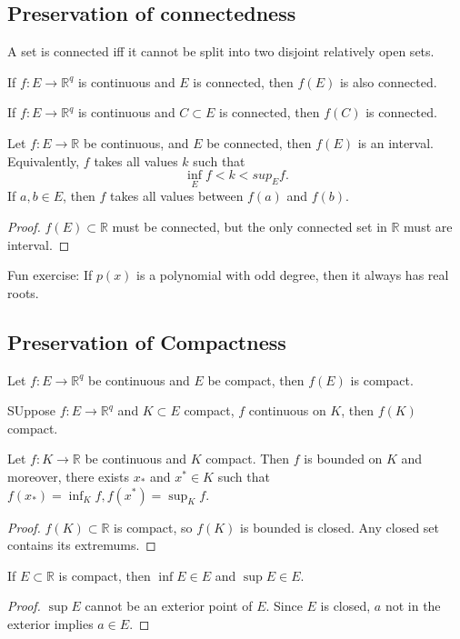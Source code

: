
\subsection{Preservation of connectedness}
\begin{proposition}
	A set is connected iff it cannot be split into two disjoint relatively open sets.
\end{proposition}
\begin{theorem}
	If $f: E \to \mathbb{R}^q$ is continuous and $E$ is connected, then $f(E)$ is also connected.
\end{theorem}

\begin{corollary}
	If $f: E \to \mathbb{R}^q$ is continuous and $C \subset E$ is connected, then $f(C)$ is connected.
\end{corollary}

\begin{theorem}
	Let $f: E \to \mathbb{R}$ be continuous, and $E$ be connected, then $f(E)$ is an interval. Equivalently, $f$ takes all values $k$ such that \[
		\operatorname{inf}_E f < k < sup_E f
	.\] 
	If $a,b \in E$, then $f$ takes all values between $f(a)$ and $f(b)$.
\end{theorem}
\begin{proof}
	$f(E) \subset \mathbb{R}$ must be connected, but the only connected set in $\mathbb{R}$ must are interval.
\end{proof}

Fun exercise: If $p(x) $ is a polynomial with odd degree, then it always has real roots.

\subsection{Preservation of Compactness}

\begin{theorem}
	Let $f: E \to \mathbb{R}^q$ be continuous and $E$ be compact, then $f(E)$ is compact.
\end{theorem}

\begin{corollary}
	SUppose $f: E \to \mathbb{R}^q$ and $K \subset E$ compact, $f$ continuous on $K$, then $f(K)$ compact.
\end{corollary}

\begin{theorem}
	Let $f: K \to \mathbb{R}$ be continuous and $K$ compact. Then $f$ is bounded on $K$ and moreover, there exists $x_*$ and $x^* \in K$ such that $f(x_*) = \operatorname{inf} _K f, f(x^*) = \operatorname{sup} _K f$.
\end{theorem}
\begin{proof}
	$f(K) \subset \mathbb{R}$ is compact, so $f(K)$ is bounded is closed. Any closed set contains its extremums.
\end{proof}

\begin{lemma}
	If $E \subset \mathbb{R}$ is compact, then $\operatorname{inf} E \in E$ and $\operatorname{sup} E \in E$.
\end{lemma}
\begin{proof}
	$\operatorname{sup} E$ cannot be an exterior point of $E$. Since $E$ is closed, $a$ not in the exterior implies $a \in E$.
\end{proof}

